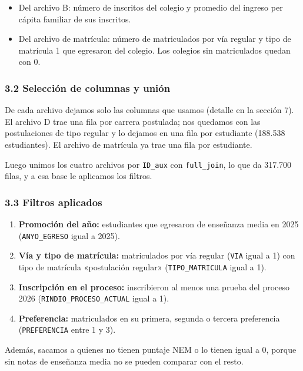 \documentclass[11pt]{article}
\begin{document}
\begin{itemize}[leftmargin=1.5em, itemsep=0.3em]
  \item Del archivo B: número de inscritos del colegio y promedio del
        ingreso per cápita familiar de sus inscritos.
  \item Del archivo de matrícula: número de matriculados por vía regular y
        tipo de matrícula 1 que egresaron del colegio. Los colegios sin
        matriculados quedan con 0.
\end{itemize}

\subsubsection*{3.2 \; Selección de columnas y unión}

De cada archivo dejamos solo las columnas que usamos (detalle en la
sección 7). El archivo D trae una fila por carrera postulada; nos quedamos con las
postulaciones de tipo regular y lo dejamos en una fila por estudiante
(188.538 estudiantes). El archivo de
matrícula ya trae una fila por estudiante.

Luego unimos los cuatro archivos por \texttt{ID\_aux} con
\texttt{full\_join}, lo que da 317.700 filas, y a esa base le aplicamos
los filtros.

\subsubsection*{3.3 \; Filtros aplicados}

\begin{enumerate}[leftmargin=1.5em, itemsep=0.3em, label=\textbf{\alph*)}]
  \item \textbf{Promoción del año:} estudiantes que egresaron de enseñanza
        media en 2025 (\texttt{ANYO\_EGRESO} igual a 2025).
  \item \textbf{Vía y tipo de matrícula:} matriculados por vía regular
        (\texttt{VIA} igual a 1) con tipo de matrícula «postulación
        regular» (\texttt{TIPO\_MATRICULA} igual a 1).
  \item \textbf{Inscripción en el proceso:} inscribieron al menos una
        prueba del proceso 2026 (\texttt{RINDIO\_PROCESO\_ACTUAL} igual
        a 1).
  \item \textbf{Preferencia:} matriculados en su primera, segunda o
        tercera preferencia (\texttt{PREFERENCIA} entre 1 y 3).
\end{enumerate}

Además, sacamos a quienes no tienen puntaje NEM o lo tienen igual a 0,
porque sin notas de enseñanza media no se pueden comparar con el resto.
\end{document}
